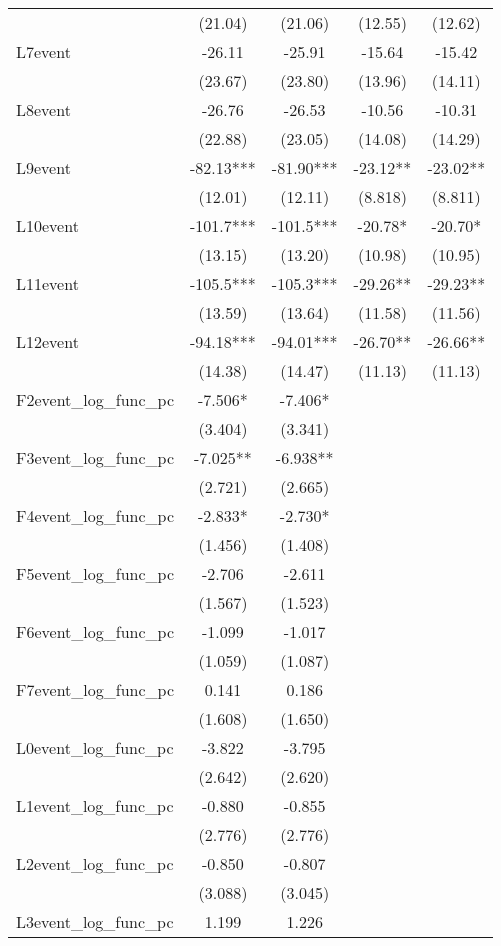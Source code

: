\documentclass[]{article}
\begin{document}
\begin{tabular}{lcccc}
 & (21.04) & (21.06) & (12.55) & (12.62) \\
L7event & -26.11 & -25.91 & -15.64 & -15.42 \\
 & (23.67) & (23.80) & (13.96) & (14.11) \\
L8event & -26.76 & -26.53 & -10.56 & -10.31 \\
 & (22.88) & (23.05) & (14.08) & (14.29) \\
L9event & -82.13*** & -81.90*** & -23.12** & -23.02** \\
 & (12.01) & (12.11) & (8.818) & (8.811) \\
L10event & -101.7*** & -101.5*** & -20.78* & -20.70* \\
 & (13.15) & (13.20) & (10.98) & (10.95) \\
L11event & -105.5*** & -105.3*** & -29.26** & -29.23** \\
 & (13.59) & (13.64) & (11.58) & (11.56) \\
L12event & -94.18*** & -94.01*** & -26.70** & -26.66** \\
 & (14.38) & (14.47) & (11.13) & (11.13) \\
F2event\_log\_func\_pc & -7.506* & -7.406* &  &  \\
 & (3.404) & (3.341) &  &  \\
F3event\_log\_func\_pc & -7.025** & -6.938** &  &  \\
 & (2.721) & (2.665) &  &  \\
F4event\_log\_func\_pc & -2.833* & -2.730* &  &  \\
 & (1.456) & (1.408) &  &  \\
F5event\_log\_func\_pc & -2.706 & -2.611 &  &  \\
 & (1.567) & (1.523) &  &  \\
F6event\_log\_func\_pc & -1.099 & -1.017 &  &  \\
 & (1.059) & (1.087) &  &  \\
F7event\_log\_func\_pc & 0.141 & 0.186 &  &  \\
 & (1.608) & (1.650) &  &  \\
L0event\_log\_func\_pc & -3.822 & -3.795 &  &  \\
 & (2.642) & (2.620) &  &  \\
L1event\_log\_func\_pc & -0.880 & -0.855 &  &  \\
 & (2.776) & (2.776) &  &  \\
L2event\_log\_func\_pc & -0.850 & -0.807 &  &  \\
 & (3.088) & (3.045) &  &  \\
L3event\_log\_func\_pc & 1.199 & 1.226 &  &  \\

\end{tabular}
\end{document}
